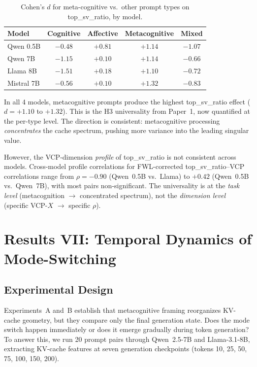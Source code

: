 \documentclass[11pt,a4paper]{article}
\begin{document}
\begin{table}[H]
\centering
\caption{Cohen's $d$ for meta-cognitive vs.\ other prompt types on top\_sv\_ratio, by model.}
\label{tab:tsv_universal}
\begin{tabular}{lcccc}
\toprule
\textbf{Model} & \textbf{Cognitive} & \textbf{Affective} & \textbf{Metacognitive} & \textbf{Mixed} \\
\midrule
Qwen 0.5B  & $-0.48$ & $+0.81$ & $+1.14$ & $-1.07$ \\
Qwen 7B    & $-1.15$ & $+0.10$ & $+1.14$ & $-0.66$ \\
Llama 8B   & $-1.51$ & $+0.18$ & $+1.10$ & $-0.72$ \\
Mistral 7B & $-0.56$ & $+0.10$ & $+1.32$ & $-0.83$ \\
\bottomrule
\end{tabular}
\end{table}

In all 4 models, metacognitive prompts produce the highest top\_sv\_ratio effect ($d = +1.10$ to $+1.32$). This is the H3 universality from Paper~1, now quantified at the per-type level. The direction is consistent: metacognitive processing \emph{concentrates} the cache spectrum, pushing more variance into the leading singular value.

However, the VCP-dimension \emph{profile} of top\_sv\_ratio is not consistent across models. Cross-model profile correlations for FWL-corrected top\_sv\_ratio--VCP correlations range from $\rho = -0.90$ (Qwen~0.5B vs.\ Llama) to $+0.42$ (Qwen~0.5B vs.\ Qwen~7B), with most pairs non-significant. The universality is at the \emph{task level} (metacognition $\to$ concentrated spectrum), not the \emph{dimension level} (specific VCP-$X$ $\to$ specific $\rho$).

\section{Results VII: Temporal Dynamics of Mode-Switching}

\subsection{Experimental Design}

Experiments~A and~B establish that metacognitive framing reorganizes KV-cache geometry, but they compare only the final generation state. Does the mode switch happen immediately or does it emerge gradually during token generation? To answer this, we run 20 prompt pairs through Qwen~2.5-7B and Llama-3.1-8B, extracting KV-cache features at seven generation checkpoints (tokens 10, 25, 50, 75, 100, 150, 200).
\end{document}

